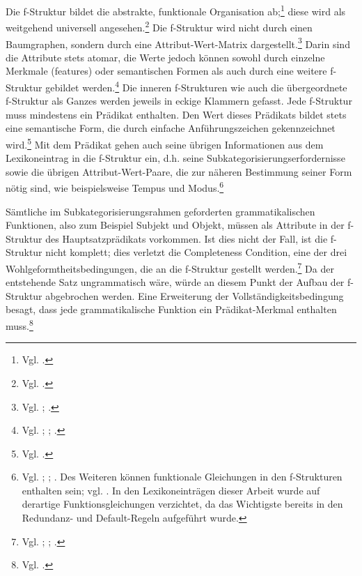 \documentclass[12pt,a4paper]{article}
\begin{document}
Die f-Struktur bildet die abstrakte, funktionale Organisation ab;\footnote{Vgl. \cite[7]{Dal}.} diese wird als weitgehend universell angesehen.\footnote{Vgl. \cite[7; 9]{Bresnan}.} Die f-Struktur wird nicht durch einen Baumgraphen, sondern durch eine Attribut-Wert-Matrix dargestellt.\footnote{Vgl. \cite[55]{Falk}; \cite[7]{Skript}.} Darin sind die Attribute stets atomar, die Werte jedoch können sowohl durch einzelne Merkmale (features) oder semantischen Formen als auch durch eine weitere f-Struktur gebildet werden.\footnote{Vgl. \cite[55]{Falk}; \cite[13]{Rohrer}; \cite[8]{Skript}.} Die inneren f-Strukturen wie auch die übergeordnete f-Struktur als Ganzes werden jeweils in eckige Klammern gefasst.
\newpage
Jede f-Struktur muss mindestens ein Prädikat enthalten. Den Wert dieses Prädikats bildet stets eine semantische Form, die durch einfache Anführungszeichen gekennzeichnet wird.\footnote{Vgl. \cite[8]{Skript}.} Mit dem Prädikat gehen auch seine übrigen Informationen aus dem Lexikoneintrag in die f-Struktur ein, d.h. seine Subkategorisierungserfordernisse sowie die übrigen Attribut-Wert-Paare, die zur näheren Bestimmung seiner Form nötig sind, wie beispielsweise Tempus und Modus.\footnote{Vgl. \cite[13; 23; 28-9]{Rohrer}; \cite[7; 9]{Skript}; \cite[7]{Dal}. Des Weiteren können funktionale Gleichungen in den f-Strukturen enthalten sein; vgl. \cite[21]{Rohrer}. In den Lexikoneinträgen dieser Arbeit wurde auf derartige Funktionsgleichungen verzichtet, da das Wichtigste bereits in den Redundanz- und Default-Regeln aufgeführt wurde.} 

Sämtliche im Subkategorisierungsrahmen geforderten grammatikalischen Funktionen, also zum Beispiel Subjekt und Objekt, müssen als Attribute in der f-Struktur des Hauptsatzprädikats vorkommen. Ist dies nicht der Fall, ist die f-Struktur nicht komplett; dies verletzt die Completeness Condition, eine der drei Wohlgeformtheitsbedingungen, die an die f-Struktur gestellt werden.\footnote{Vgl. \cite[58-9]{Falk}; \cite[28]{Rohrer}; \cite[19-20]{Skript}.} Da der entstehende Satz ungrammatisch wäre, würde an diesem Punkt der Aufbau der f-Struktur abgebrochen werden. Eine Erweiterung der Vollständigkeitsbedingung besagt, dass jede grammatikalische Funktion ein Prädikat-Merkmal enthalten muss.\footnote{Vgl. \cite[61]{Falk}.}
\end{document}
